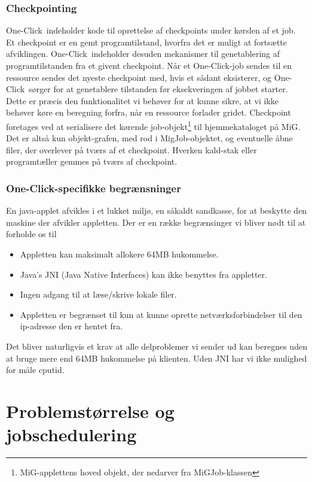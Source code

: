 \documentclass[draft,a4paper,11pt]{article}
\newcommand{\mig}{MiG}
\newcommand{\oc}{One-Click}
\begin{document}
\subsubsection{Checkpointing}
\oc\ indeholder kode til oprettelse af checkpoints under kørslen af et job. Et checkpoint er en gemt programtilstand, hvorfra det er muligt at fortsætte afviklingen. \oc\ indeholder desuden mekanismer til genetablering af programtilstanden fra et givent checkpoint. Når et \oc-job sendes til en ressource sendes det nyeste checkpoint med, hvis et sådant eksisterer, og \oc\ sørger for at genetablere tilstanden før eksekveringen af jobbet starter. Dette er præcis den funktionalitet vi behøver for at kunne sikre, at vi ikke behøver køre en beregning forfra, når en ressource forlader gridet.
Checkpoint foretages ved at serialisere det kørende job-objekt\footnote{\mig-applettens hoved objekt, der nedarver fra MiGJob-klassen} til hjemmekataloget på \mig. Det er altså kun objekt-grafen, med rod i MigJob-objektet, og eventuelle åbne filer, der overlever på tværs af et checkpoint. Hverken kald-stak eller programtæller gemmes på tværs af checkpoint.

\subsubsection{\oc-specifikke begrænsninger}
En java-applet afvikles i et lukket miljø, en såkaldt sandkasse, for at beskytte den maskine der afvikler appletten. Der er en række begrænsinger vi bliver nødt til at forholde os til
\begin{itemize}
	\item Appletten kan maksimalt allokere 64MB hukommelse.
	\item Java's JNI (Java Native Interfaces) kan ikke benyttes fra appletter. 
	\item Ingen adgang til at læse/skrive lokale filer.
	\item Appletten er begrænset til kun at kunne oprette netværksforbindelser til den ip-adresse den er hentet fra.
\end{itemize}

Det bliver naturligvis et krav at alle delproblemer vi sender ud kan beregnes uden at bruge mere end 64MB hukommelse på klienten. Uden JNI har vi ikke mulighed for måle cputid.

\section{Problemstørrelse og jobschedulering}\label{opdelingogschedulering}
\end{document}
